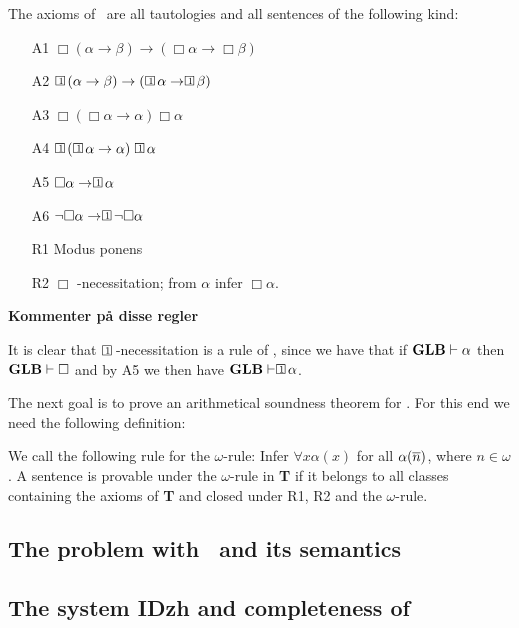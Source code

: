 \documentclass[../main.tex]{subfiles}
\begin{document}
\begin{defi}
	The axioms of \GLB\ are all tautologies and all sentences of the
	following kind:
	\begin{enumerate}
		\item[A1]
			$\Box(\alpha\rightarrow\beta)\rightarrow(\Box\alpha\rightarrow\Box\beta)$
		\item[A2]
			$\OneBox(\alpha\rightarrow\beta)\rightarrow(\OneBox\alpha\rightarrow\OneBox\beta)$
		\item[A3] $\Box(\Box\alpha\rightarrow\alpha)\Box\alpha$
		\item[A4] $\OneBox(\OneBox\alpha\rightarrow\alpha)\OneBox\alpha$
		\item[A5] $\Box\alpha\rightarrow\OneBox\alpha$
		\item[A6] $\neg\Box\alpha\rightarrow\OneBox\neg\Box\alpha$
		\item[R1] Modus ponens
		\item[R2] $\Box$  -necessitation; from $\alpha$ infer
			$\Box\alpha$.
	\end{enumerate}
\end{defi}
\textbf{Kommenter på disse regler}

It is clear that $\OneBox$ -necessitation is a rule of \GLB, since we have that
if $\text{\textbf{GLB}}\vdash\alpha$ then $\text{\textbf{GLB}}\vdash\Box$ and by A5 we then have
$\GLB\vdash\OneBox\alpha$.

The next goal is to prove an arithmetical soundness theorem for \GLB. For this
end we need the following definition:

\begin{defi}
	We call the following rule for the  $\omega$-rule: Infer $\forall
	x\alpha(x)$ for all $\alpha(\overline n)$, where $n\in\omega$. A sentence is
	provable under the $\omega$-rule in \textbf{T} if it belongs to all
	classes containing the axioms of \textbf{T} and closed under R1, R2 and
	the $\omega$-rule.
\end{defi}

\subsection{The problem with \GLB\ and its semantics}

\subsection{The system \textbf{IDzh} and completeness of \GLB}
\end{document}
